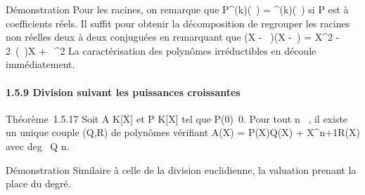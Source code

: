 Démonstration Pour les racines, on remarque que
P^(k)(\overline\alpha~) =
\overlineP^(k)(\alpha~) si P est à coefficients
réels. Il suffit pour obtenir la décomposition de regrouper les racines
non réelles deux à deux conjuguées en remarquant que (X - \beta~)(X
-\overline\beta~) = X^2 -
2\mathrmRe~(\beta~)X +
\beta~^2 La caractérisation des polynômes
irréductibles en découle immédiatement.

\paragraph{1.5.9 Division suivant les puissances croissantes}

Théorème~1.5.17 Soit A \in K[X] et P \in K[X] tel que
P(0)\neq~0. Pour tout n \in {}~, il existe un unique
couple (Q,R) de polynômes vérifiant A(X) = P(X)Q(X) +
X^n+1R(X) avec deg~ Q \leq n.

Démonstration Similaire à celle de la division euclidienne, la valuation
prenant la place du degré.
